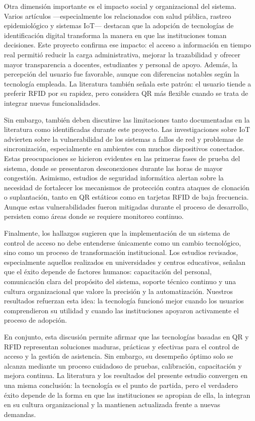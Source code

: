 Otra dimensión importante es el impacto social y organizacional del sistema. Varios artículos —especialmente los relacionados con salud pública, rastreo epidemiológico y sistemas IoT— destacan que la adopción de tecnologías de identificación digital transforma la manera en que las instituciones toman decisiones. Este proyecto confirma ese impacto: el acceso a información en tiempo real permitió reducir la carga administrativa, mejorar la trazabilidad y ofrecer mayor transparencia a docentes, estudiantes y personal de apoyo. Además, la percepción del usuario fue favorable, aunque con diferencias notables según la tecnología empleada. La literatura también señala este patrón: el usuario tiende a preferir RFID por su rapidez, pero considera QR más flexible cuando se trata de integrar nuevas funcionalidades.

Sin embargo, también deben discutirse las limitaciones tanto documentadas en la literatura como identificadas durante este proyecto. Las investigaciones sobre IoT advierten sobre la vulnerabilidad de los sistemas a fallos de red y problemas de sincronización, especialmente en ambientes con muchos dispositivos conectados. Estas preocupaciones se hicieron evidentes en las primeras fases de prueba del sistema, donde se presentaron desconexiones durante las horas de mayor congestión. Asimismo, estudios de seguridad informática alertan sobre la necesidad de fortalecer los mecanismos de protección contra ataques de clonación o suplantación, tanto en QR estáticos como en tarjetas RFID de baja frecuencia. Aunque estas vulnerabilidades fueron mitigadas durante el proceso de desarrollo, persisten como áreas donde se requiere monitoreo continuo.

Finalmente, los hallazgos sugieren que la implementación de un sistema de control de acceso no debe entenderse únicamente como un cambio tecnológico, sino como un proceso de transformación institucional. Los estudios revisados, especialmente aquellos realizados en universidades y centros educativos, señalan que el éxito depende de factores humanos: capacitación del personal, comunicación clara del propósito del sistema, soporte técnico continuo y una cultura organizacional que valore la precisión y la automatización. Nuestros resultados refuerzan esta idea: la tecnología funcionó mejor cuando los usuarios comprendieron su utilidad y cuando las instituciones apoyaron activamente el proceso de adopción.

En conjunto, esta discusión permite afirmar que las tecnologías basadas en QR y RFID representan soluciones maduras, prácticas y efectivas para el control de acceso y la gestión de asistencia. Sin embargo, su desempeño óptimo solo se alcanza mediante un proceso cuidadoso de pruebas, calibración, capacitación y mejora continua. La literatura y los resultados del presente estudio convergen en una misma conclusión: la tecnología es el punto de partida, pero el verdadero éxito depende de la forma en que las instituciones se apropian de ella, la integran en su cultura organizacional y la mantienen actualizada frente a nuevas demandas.
